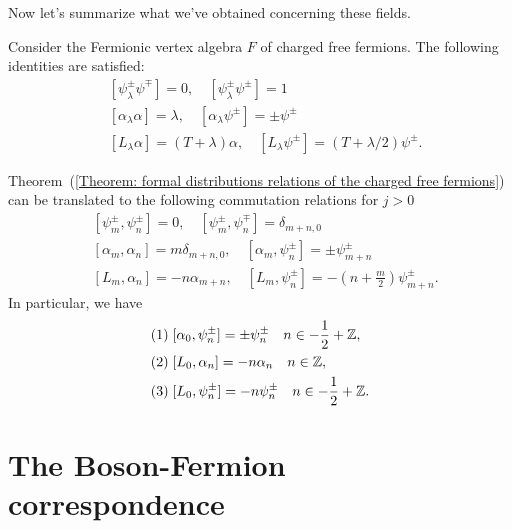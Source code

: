 Now let's summarize what we've obtained concerning these fields.
\begin{dang}
    \begin{theorem}\label{Theorem: formal distributions relations of the charged free fermions}
        Consider the Fermionic vertex algebra $F$ of charged free fermions. The following identities are satisfied:
        \begin{equation}
        \begin{split}
              &[\psi^\pm_\lambda\psi^\mp]=0,\quad[\psi^\pm_\lambda\psi^\pm]=1\\
                &[\alpha_\lambda\alpha]=\lambda,\quad [\alpha_\lambda\psi^\pm]=\pm\psi^\pm\\
                &[L_\lambda \alpha]=(T+\lambda)\alpha,\quad[L_\lambda\psi^\pm]=(T+\lambda/2)\psi^\pm.
        \end{split}
        \end{equation}
    \end{theorem}
\end{dang}
Theorem~(\ref{Theorem: formal distributions relations of the charged free fermions}) can be translated to the following commutation relations for $j>0$ 
\begin{equation}\label{Equation: nodes relations for the fermionic vertex algebra}
    \begin{split}
        &[\psi_m^\pm,\psi^\pm_n]=0,\quad[\psi^\pm_m,\psi^\mp_n]=\delta_{m+n,0}\\
        &[\alpha_m,\alpha_n]=m\delta_{m+n,0},\quad[\alpha_m,\psi^\pm_n]=\pm\psi^\pm_{m+n}\\
        &[L_m,\alpha_n]=-n\alpha_{m+n},\quad[L_m,\psi^\pm_n]=-\left(n+\frac{m}{2}\right)\psi^\pm_{m+n}.
    \end{split}
\end{equation}
In particular, we have
\begin{equation}\label{Equations: eignditribution relations}
    \begin{split}
        &(1)\;[\alpha_0,\psi^\pm_n]=\pm\psi^\pm_n\quad n\in-\frac{1}{2}+\mathbb{Z},\\
        &(2)\;[L_0,\alpha_n]=-n\alpha_n\quad n\in\mathbb{Z},\\
        &(3)\;[L_0,\psi^\pm_n]=-n\psi^\pm_n\quad n\in-\frac{1}{2}+\mathbb{Z}.
    \end{split}
\end{equation}

\section{The Boson-Fermion correspondence}
